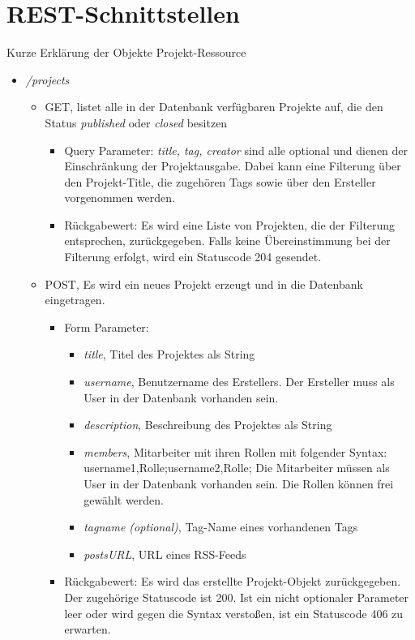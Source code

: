 \documentclass[12pt]{scrartcl}
\begin{document}
		\section{REST-Schnittstellen}
		Kurze Erklärung der Objekte
		Projekt-Ressource
		\begin{itemize}
		
		
				\item \emph{/projects}
				\begin{itemize}
					\item GET, listet alle in der Datenbank verfügbaren Projekte auf, die den Status \emph{published} oder \emph{closed} besitzen
					\begin{itemize}
						\item Query Parameter: \emph{title, tag, creator} sind alle optional und dienen der Einschränkung der Projektausgabe. Dabei kann eine Filterung über den Projekt-Title, die zugehören Tags sowie über den Ersteller vorgenommen werden. 
						\item Rückgabewert: Es wird eine Liste von Projekten, die der Filterung entsprechen, zurückgegeben. Falls keine Übereinstimmung bei der Filterung erfolgt, wird ein Statuscode 204 gesendet. 
					\end{itemize}
					\item POST, Es wird ein neues Projekt erzeugt und in die Datenbank eingetragen.
					\begin{itemize}
						\item Form Parameter:
						\begin{itemize}
							\item  \emph{title}, Titel des Projektes als String
							\item  \emph{username}, Benutzername des Erstellers. Der Ersteller muss als User in der Datenbank vorhanden sein.
							\item  \emph{description}, Beschreibung des Projektes als String
							\item  \emph{members}, Mitarbeiter mit ihren Rollen mit folgender Syntax: username1,Rolle;username2,Rolle; Die Mitarbeiter müssen als User in der Datenbank vorhanden sein. Die Rollen können frei gewählt werden.
							\item  \emph{tagname (optional)}, Tag-Name eines vorhandenen Tags
							\item \emph{postsURL}, URL eines RSS-Feeds 
						\end{itemize}
						\item Rückgabewert: Es wird das erstellte Projekt-Objekt zurückgegeben. Der zugehörige Statuscode ist 200. Ist ein nicht optionaler Parameter leer oder wird gegen die Syntax verstoßen, ist ein Statuscode 406 zu erwarten.  

\end{itemize}
\end{itemize}
\end{itemize}
\end{document}
